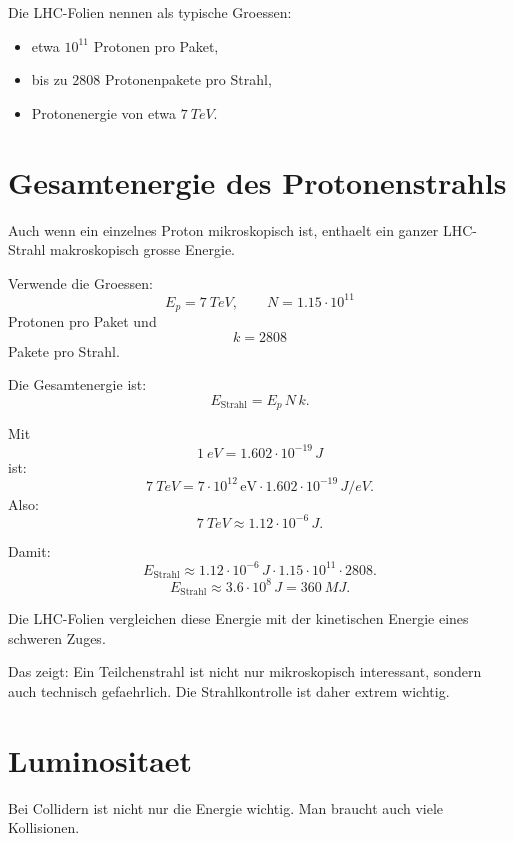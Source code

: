 \begin{notebox}
Die LHC-Folien nennen als typische Groessen:
\begin{itemize}
    \item etwa $10^{11}$ Protonen pro Paket,
    \item bis zu $2808$ Protonenpakete pro Strahl,
    \item Protonenergie von etwa $\SI{7}{TeV}$.
\end{itemize}
\end{notebox}

\section{Gesamtenergie des Protonenstrahls}

Auch wenn ein einzelnes Proton mikroskopisch ist, enthaelt ein ganzer LHC-Strahl
makroskopisch grosse Energie.

\begin{calculationbox}
Verwende die Groessen:
\[
    E_p=\SI{7}{TeV},
    \qquad
    N=1.15\cdot 10^{11}
\]
Protonen pro Paket und
\[
    k=2808
\]
Pakete pro Strahl.

Die Gesamtenergie ist:
\[
    E_{\mathrm{Strahl}}
    =
    E_p\,N\,k.
\]

Mit
\[
    \SI{1}{eV}=1.602\cdot 10^{-19}\,\si{J}
\]
ist:
\[
    \SI{7}{TeV}
    =
    7\cdot 10^{12}\,\mathrm{eV}
    \cdot
    1.602\cdot 10^{-19}\,\si{J/eV}.
\]
Also:
\[
    \SI{7}{TeV}
    \approx
    1.12\cdot 10^{-6}\,\si{J}.
\]

Damit:
\[
    E_{\mathrm{Strahl}}
    \approx
    1.12\cdot 10^{-6}\,\si{J}
    \cdot
    1.15\cdot 10^{11}
    \cdot
    2808.
\]
\[
    E_{\mathrm{Strahl}}
    \approx
    3.6\cdot 10^{8}\,\si{J}
    =
    \SI{360}{MJ}.
\]
\end{calculationbox}

\begin{conceptbox}
Die LHC-Folien vergleichen diese Energie mit der kinetischen Energie eines schweren
Zuges.

Das zeigt:
Ein Teilchenstrahl ist nicht nur mikroskopisch interessant, sondern auch technisch
gefaehrlich.
Die Strahlkontrolle ist daher extrem wichtig.
\end{conceptbox}

\section{Luminositaet}

Bei Collidern ist nicht nur die Energie wichtig.
Man braucht auch viele Kollisionen.

